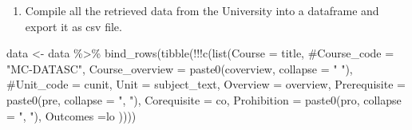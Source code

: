 \documentclass[
  letterpaper,
  DIV=11,
  numbers=noendperiod]{scrreport}
\newenvironment{Shaded}{\begin{snugshade}}{\end{snugshade}}
\newcommand{\AttributeTok}[1]{\textcolor[rgb]{0.40,0.45,0.13}{#1}}
\newcommand{\CommentTok}[1]{\textcolor[rgb]{0.37,0.37,0.37}{#1}}
\newcommand{\ControlFlowTok}[1]{\textcolor[rgb]{0.00,0.23,0.31}{#1}}
\newcommand{\DecValTok}[1]{\textcolor[rgb]{0.68,0.00,0.00}{#1}}
\newcommand{\FunctionTok}[1]{\textcolor[rgb]{0.28,0.35,0.67}{#1}}
\newcommand{\NormalTok}[1]{\textcolor[rgb]{0.00,0.23,0.31}{#1}}
\newcommand{\OtherTok}[1]{\textcolor[rgb]{0.00,0.23,0.31}{#1}}
\newcommand{\SpecialCharTok}[1]{\textcolor[rgb]{0.37,0.37,0.37}{#1}}
\newcommand{\StringTok}[1]{\textcolor[rgb]{0.13,0.47,0.30}{#1}}
\providecommand{\tightlist}{%
  \setlength{\itemsep}{0pt}\setlength{\parskip}{0pt}}\usepackage{longtable,booktabs,array}
\begin{document}
\begin{Shaded}
\end{Shaded}

\begin{enumerate}
\def\labelenumi{\arabic{enumi}.}
\setcounter{enumi}{5}
\tightlist
\item
  Compile all the retrieved data from the University into a dataframe
  and export it as csv file.
\end{enumerate}

\begin{Shaded}
\begin{Highlighting}[]
\NormalTok{data }\OtherTok{\textless{}{-}}\NormalTok{ data }\SpecialCharTok{\%\textgreater{}\%} 
        \FunctionTok{bind\_rows}\NormalTok{(}\FunctionTok{tibble}\NormalTok{(}\SpecialCharTok{!!!}\FunctionTok{c}\NormalTok{(}\FunctionTok{list}\NormalTok{(}\AttributeTok{Course =}\NormalTok{ title, }
                                   \CommentTok{\#Course\_code = "MC{-}DATASC", }
                                   \AttributeTok{Course\_overview =} \FunctionTok{paste0}\NormalTok{(coverview, }\AttributeTok{collapse =} \StringTok{" "}\NormalTok{),}
                                   \CommentTok{\#Unit\_code = cunit,}
                                   \AttributeTok{Unit =}\NormalTok{ subject\_text,}
                                   \AttributeTok{Overview =}\NormalTok{ overview,}
                                   \AttributeTok{Prerequisite =} \FunctionTok{paste0}\NormalTok{(pre, }\AttributeTok{collapse =} \StringTok{", "}\NormalTok{),}
                                   \AttributeTok{Corequisite =}\NormalTok{ co,}
                                   \AttributeTok{Prohibition =} \FunctionTok{paste0}\NormalTok{(pro, }\AttributeTok{collapse =} \StringTok{", "}\NormalTok{),}
                                   \AttributeTok{Outcomes =}\NormalTok{lo}
\NormalTok{                                   ))))}
\end{Highlighting}
\end{Shaded}
\end{document}
